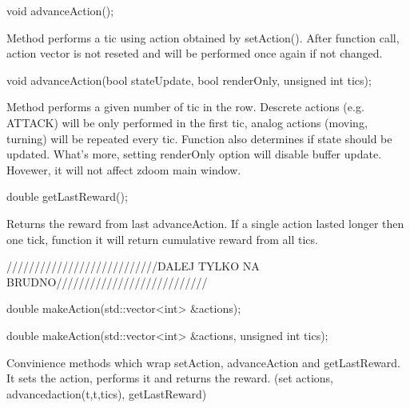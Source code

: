 \vspace{20pt}
\begin{clinee}
	void advanceAction();
\end{clinee}

Method performs a tic using action obtained by setAction(). After function call, action vector is not reseted and will be performed once again if not changed.


\vspace{20pt}
\begin{clinee}
	void advanceAction(bool stateUpdate, bool renderOnly, unsigned int tics);
\end{clinee}

Method performs a given number of tic in the row. Descrete actions (e.g. ATTACK) will be only performed in the first tic, analog actions (moving, turning) will be repeated every tic. 
Function also determines if state should be updated. What's more, setting renderOnly option will disable buffer update. Hovewer, it will not affect zdoom main window.  


\vspace{20pt}
\begin{clinee}
	double getLastReward();
\end{clinee}

Returns the reward from last advanceAction. If a single action lasted longer then one tick, function it will return cumulative reward from all tics.


\vspace{20pt}
///////////////////////////DALEJ TYLKO NA BRUDNO///////////////////////////
\begin{clinee}
	double makeAction(std::vector<int> &actions);
\end{clinee}
\begin{clinee}
	double makeAction(std::vector<int> &actions, unsigned int tics);
\end{clinee}
Convinience methods which wrap setAction, advanceAction and getLastReward.
It sets the action, performs it and returns the reward. (set actions, advancedaction(t,t,tics), getLastReward)

